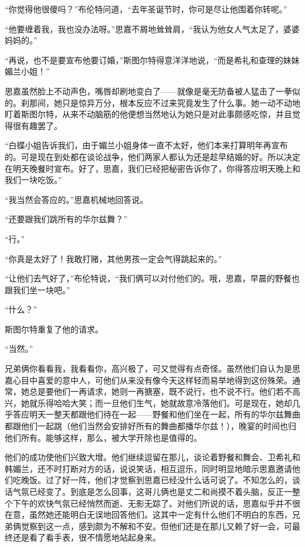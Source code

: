 \par “你觉得他很傻吗？”布伦特问道，“去年圣诞节时，你可是尽让他围着你转呢。”
\par “他要缠着我，我也没办法呀。”思嘉不屑地耸耸肩，“我认为他女人气太足了，婆婆妈妈的。”
\par “再说，也不是要宣布他要订婚，”斯图尔特得意洋洋地说，“而是希礼和查理的妹妹媚兰小姐！”
\par 思嘉虽然脸上不动声色，嘴唇却刷地变白了——就像是毫无防备被人猛击了一拳似的。刹那间，她只是惊异万分，根本反应不过来究竟发生了什么事。她一动不动地盯着斯图尔特，从来不动脑筋的他便想当然地认为她只是对此事颇感吃惊，并且觉得很有趣罢了。
\par “白蝶小姐告诉我们，由于媚兰小姐身体一直不太好，他们本来打算明年再宣布的。可是现在到处都在谈论战争，他们两家人都认为还是趁早结婚的好。所以决定在明天晚餐时宣布。好了，思嘉，我们已经把秘密告诉你了，你得答应明天晚上和我们一块吃饭。”
\par “我当然会答应的。”思嘉机械地回答说。
\par “还要跟我们跳所有的华尔兹舞？”
\par “行。”
\par “你真是太好了！我敢打赌，其他男孩一定会气得跳起来的。”
\par “让他们去气好了，”布伦特说，“我们俩可以对付他们的。哦，思嘉，早晨的野餐也跟我们坐一块吧。”
\par “什么？”
\par 斯图尔特重复了他的请求。
\par “当然。”
\par 兄弟俩你看看我，我看看你，高兴极了，可又觉得有点奇怪。虽然他们自认为是思嘉心目中喜爱的意中人，可他们从来没有像今天这样轻而易举地得到这份殊荣。通常，她总是要他们一再请求，她则一再搪塞，既不说行，也不说不行。他们若不高兴，她就乐得哈哈大笑；而一旦他们生气，她就故意冷落他们。可是现在，她却几乎答应明天一整天都跟他们待在一起——野餐和他们坐在一起，所有的华尔兹舞曲都跟他们一起跳（他们当然会安排好所有的舞曲都播华尔兹！），晚宴的时间也归他们所有。能够这样，那么，被大学开除也是值得的。
\par 他们的成功使他们兴致大增。他们继续逗留在那儿，谈论着野餐和舞会、卫希礼和韩媚兰，还不时打断对方的话，说说笑话，相互逗乐，同时明显地暗示思嘉邀请他们吃晚饭。过了好一阵，他们才觉察到思嘉已经没什么话可说了。不知怎么的，谈话气氛已经变了。到底是怎么回事，这哥儿俩也是丈二和尚摸不着头脑，反正一整个下午的欢快气氛已经悄然而逝、无影无踪了。对他们所说的话，思嘉似乎并不很在意，虽然她还能明白无误地回答他们。这其中一定有什么他们不明白的东西，兄弟俩觉察到这一点，感到颇为不解和不安。但他们还是在那儿又赖了好一会，可最终还是看了看手表，很不情愿地站起身来。
